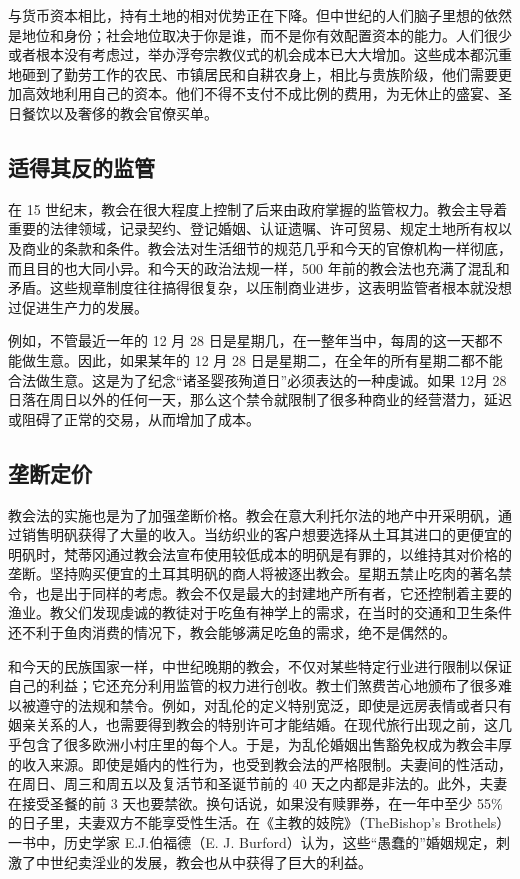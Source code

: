 与货币资本相比，持有土地的相对优势正在下降。但中世纪的人们脑子里想的依然是地位和身份；社会地位取决于你是谁，而不是你有效配置资本的能力。人们很少或者根本没有考虑过，举办浮夸宗教仪式的机会成本已大大增加。这些成本都沉重地砸到了勤劳工作的农民、市镇居民和自耕农身上，相比与贵族阶级，他们需要更加高效地利用自己的资本。他们不得不支付不成比例的费用，为无休止的盛宴、圣日餐饮以及奢侈的教会官僚买单。

\subsection{适得其反的监管}
在 15 世纪末，教会在很大程度上控制了后来由政府掌握的监管权力。教会主导着重要的法律领域，记录契约、登记婚姻、认证遗嘱、许可贸易、规定土地所有权以及商业的条款和条件。教会法对生活细节的规范几乎和今天的官僚机构一样彻底，而且目的也大同小异。和今天的政治法规一样，500 年前的教会法也充满了混乱和矛盾。这些规章制度往往搞得很复杂，以压制商业进步，这表明监管者根本就没想过促进生产力的发展。

例如，不管最近一年的 12 月 28 日是星期几，在一整年当中，每周的这一天都不能做生意。因此，如果某年的 12 月 28 日是星期二，在全年的所有星期二都不能合法做生意。这是为了纪念“诸圣婴孩殉道日”必须表达的一种虔诚。如果 12月 28 日落在周日以外的任何一天，那么这个禁令就限制了很多种商业的经营潜力，延迟或阻碍了正常的交易，从而增加了成本。

\subsection{垄断定价}
教会法的实施也是为了加强垄断价格。教会在意大利托尔法的地产中开采明矾，通过销售明矾获得了大量的收入。当纺织业的客户想要选择从土耳其进口的更便宜的明矾时，梵蒂冈通过教会法宣布使用较低成本的明矾是有罪的，以维持其对价格的垄断。坚持购买便宜的土耳其明矾的商人将被逐出教会。星期五禁止吃肉的著名禁令，也是出于同样的考虑。教会不仅是最大的封建地产所有者，它还控制着主要的渔业。教父们发现虔诚的教徒对于吃鱼有神学上的需求，在当时的交通和卫生条件还不利于鱼肉消费的情况下，教会能够满足吃鱼的需求，绝不是偶然的。

和今天的民族国家一样，中世纪晚期的教会，不仅对某些特定行业进行限制以保证自己的利益；它还充分利用监管的权力进行创收。教士们煞费苦心地颁布了很多难以被遵守的法规和禁令。例如，对乱伦的定义特别宽泛，即使是远房表情或者只有姻亲关系的人，也需要得到教会的特别许可才能结婚。在现代旅行出现之前，这几乎包含了很多欧洲小村庄里的每个人。于是，为乱伦婚姻出售豁免权成为教会丰厚的收入来源。即使是婚内的性行为，也受到教会法的严格限制。夫妻间的性活动，在周日、周三和周五以及复活节和圣诞节前的 40 天之内都是非法的。此外，夫妻在接受圣餐的前 3 天也要禁欲。换句话说，如果没有赎罪券，在一年中至少 55\%的日子里，夫妻双方不能享受性生活。在《主教的妓院》（TheBishop's Brothels）一书中，历史学家 E.J.伯福德（E. J. Burford）认为，这些“愚蠢的”婚姻规定，刺激了中世纪卖淫业的发展，教会也从中获得了巨大的利益。

